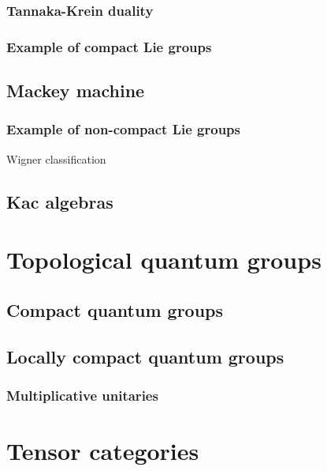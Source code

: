 \documentclass{../../large}
\begin{document}
\section{Tannaka-Krein duality}
\section{Example of compact Lie groups}

\chapter{Mackey machine}
\section{Example of non-compact Lie groups}
Wigner classification








\chapter{Kac algebras}




\part{Topological quantum groups}
\chapter{Compact quantum groups}
\chapter{Locally compact quantum groups}
\section{Multiplicative unitaries}


\part{Tensor categories}
\end{document}
